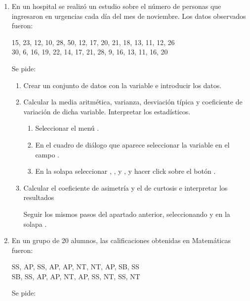 \begin{enumerate}[leftmargin=*]
\item En un hospital se realizó un estudio sobre el número de personas que ingresaron en urgencias cada día del mes de
noviembre. 
Los datos observados fueron:
\begin{center}
15, 23, 12, 10, 28, 50, 12, 17, 20, 21, 18, 13, 11, 12, 26 \\
30, 6, 16, 19, 22, 14, 17, 21, 28, 9, 16, 13, 11, 16, 20
\end{center}
Se pide:

\begin{enumerate}
\item Crear un conjunto de datos con la variable  e introducir los datos.

\item Calcular la media aritmética, varianza, desviación típica y coeficiente de variación de dicha variable.
Interpretar los estadísticos. 
\begin{indicacion}{
\begin{enumerate}
\item Seleccionar el menú .
\item En el cuadro de diálogo que aparece seleccionar la variable  en el campo .
\item En la solapa  seleccionar , , 
 y , y hacer click sobre el botón .
\end{enumerate}}
\end{indicacion}

\item Calcular el coeficiente de asimetría y el de curtosis e interpretar los resultados
\begin{indicacion}{
Seguir los mismos pasos del apartado anterior, seleccionando  y  en la solapa .}
\end{indicacion}
\end{enumerate}


\item En un grupo de 20 alumnos, las calificaciones obtenidas en Matemáticas fueron:
\begin{center}
SS, AP, SS, AP, AP, NT, NT, AP, SB, SS \\
SB, SS, AP, AP, NT, AP, SS, NT, SS, NT
\end{center}
Se pide:


\end{enumerate}

